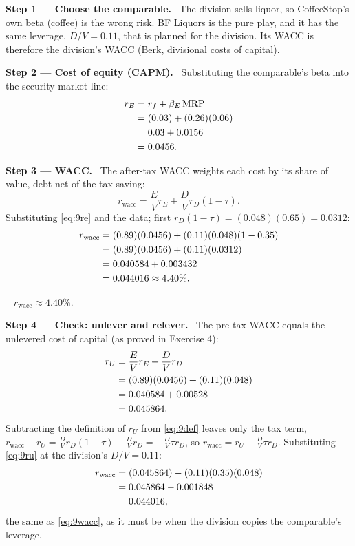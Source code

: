 \documentclass[11pt,a4paper]{article}
\numberwithin{equation}{section}
\newcommand{\step}[2]{\par\medskip\noindent\textbf{Step #1 --- #2.}~}
\newcommand{\answer}[1]{\par\smallskip\noindent\fbox{\textbf{Answer #1.}}~}
\begin{document}
\step{1}{Choose the comparable} The division sells liquor, so CoffeeStop's own beta (coffee) is
the wrong risk. BF Liquors is the pure play, and it has the same leverage, $D/V=0.11$, that is
planned for the division. Its WACC is therefore the division's WACC (Berk, divisional costs of
capital).

\step{2}{Cost of equity (CAPM)} Substituting the comparable's beta into the security market line:
\begin{align}
  r_E &= r_f + \beta_E\,\mathrm{MRP} \notag\\
      &= (0.03) + (0.26)(0.06) \notag\\
      &= 0.03 + 0.0156 \notag\\
      &= 0.0456. \label{eq:9re}
\end{align}

\step{3}{WACC} The after-tax WACC weights each cost by its share of value, debt net of the tax
saving:
\begin{equation}\label{eq:9def}
  r_{\mathrm{wacc}} = \frac{E}{V}r_E + \frac{D}{V}r_D(1-\tau).
\end{equation}
Substituting \eqref{eq:9re} and the data; first $r_D(1-\tau)=(0.048)(0.65)=0.0312$:
\begin{align}
  r_{\mathrm{wacc}} &= (0.89)(0.0456) + (0.11)(0.048)(1-0.35) \notag\\
                    &= (0.89)(0.0456) + (0.11)(0.0312) \notag\\
                    &= 0.040584 + 0.003432 \notag\\
                    &= 0.044016 \approx 4.40\%. \label{eq:9wacc}
\end{align}

\answer{(WACC)} $r_{\mathrm{wacc}}\approx4.40\%$.

\step{4}{Check: unlever and relever} The pre-tax WACC equals the unlevered cost of capital (as
proved in Exercise 4):
\begin{align}
  r_U &= \frac{E}{V}r_E + \frac{D}{V}r_D \notag\\
      &= (0.89)(0.0456) + (0.11)(0.048) \notag\\
      &= 0.040584 + 0.00528 \notag\\
      &= 0.045864. \label{eq:9ru}
\end{align}
Subtracting the definition of $r_U$ from \eqref{eq:9def} leaves only the tax term,
$r_{\mathrm{wacc}}-r_U=\frac{D}{V}r_D(1-\tau)-\frac{D}{V}r_D=-\frac{D}{V}\tau r_D$, so
$r_{\mathrm{wacc}} = r_U - \frac{D}{V}\tau r_D$. Substituting \eqref{eq:9ru} at the division's $D/V=0.11$:
\begin{align}
  r_{\mathrm{wacc}} &= (0.045864) - (0.11)(0.35)(0.048) \notag\\
                    &= 0.045864 - 0.001848 \notag\\
                    &= 0.044016, \notag
\end{align}
the same as \eqref{eq:9wacc}, as it must be when the division copies the comparable's leverage.
\end{document}
